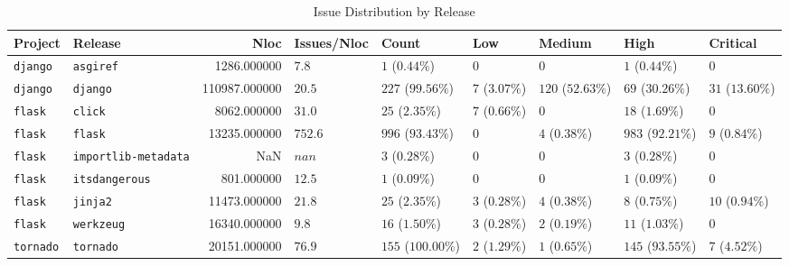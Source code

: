 \begin{table}
\caption{Issue Distribution by Release}
\label{tab:issue-release-distribution}
\begin{tabular}{llrllllll}
\toprule
Project & Release & Nloc & Issues/Nloc & Count & Low & Medium & High & Critical \\
\midrule
\texttt{django} & \texttt{asgiref} & 1286.000000 & $7.8$ & $1$ ($0.44\%$) & $0$ & $0$ & $1$ ($0.44\%$) & $0$ \\
\texttt{django} & \texttt{django} & 110987.000000 & $20.5$ & $227$ ($99.56\%$) & $7$ ($3.07\%$) & $120$ ($52.63\%$) & $69$ ($30.26\%$) & $31$ ($13.60\%$) \\
\texttt{flask} & \texttt{click} & 8062.000000 & $31.0$ & $25$ ($2.35\%$) & $7$ ($0.66\%$) & $0$ & $18$ ($1.69\%$) & $0$ \\
\texttt{flask} & \texttt{flask} & 13235.000000 & $752.6$ & $996$ ($93.43\%$) & $0$ & $4$ ($0.38\%$) & $983$ ($92.21\%$) & $9$ ($0.84\%$) \\
\texttt{flask} & \texttt{importlib-metadata} & NaN & $nan$ & $3$ ($0.28\%$) & $0$ & $0$ & $3$ ($0.28\%$) & $0$ \\
\texttt{flask} & \texttt{itsdangerous} & 801.000000 & $12.5$ & $1$ ($0.09\%$) & $0$ & $0$ & $1$ ($0.09\%$) & $0$ \\
\texttt{flask} & \texttt{jinja2} & 11473.000000 & $21.8$ & $25$ ($2.35\%$) & $3$ ($0.28\%$) & $4$ ($0.38\%$) & $8$ ($0.75\%$) & $10$ ($0.94\%$) \\
\texttt{flask} & \texttt{werkzeug} & 16340.000000 & $9.8$ & $16$ ($1.50\%$) & $3$ ($0.28\%$) & $2$ ($0.19\%$) & $11$ ($1.03\%$) & $0$ \\
\texttt{tornado} & \texttt{tornado} & 20151.000000 & $76.9$ & $155$ ($100.00\%$) & $2$ ($1.29\%$) & $1$ ($0.65\%$) & $145$ ($93.55\%$) & $7$ ($4.52\%$) \\
\bottomrule
\end{tabular}
\end{table}
